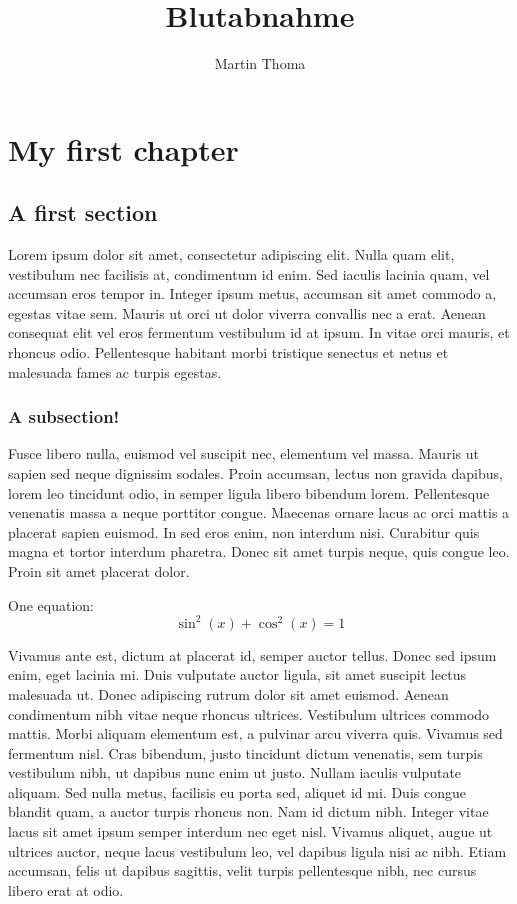 \documentclass[11pt,a4paper,oneside]{report}
\begin{document}
 \title{Blutabnahme}
 \author{Martin Thoma}

\maketitle
\tableofcontents

\chapter{My first chapter}
\section{A first section}
Lorem ipsum dolor sit amet, consectetur adipiscing elit. Nulla quam elit, vestibulum nec facilisis at, condimentum id enim. Sed iaculis lacinia quam, vel accumsan eros tempor in. Integer ipsum metus, accumsan sit amet commodo a, egestas vitae sem. Mauris ut orci ut dolor viverra convallis nec a erat. Aenean consequat elit vel eros fermentum vestibulum id at ipsum. In vitae orci mauris, et rhoncus odio. Pellentesque habitant morbi tristique senectus et netus et malesuada fames ac turpis egestas.

\subsection{A subsection!}
Fusce libero nulla, euismod vel suscipit nec, elementum vel massa. Mauris ut sapien sed neque dignissim sodales. Proin accumsan, lectus non gravida dapibus, lorem leo tincidunt odio, in semper ligula libero bibendum lorem. Pellentesque venenatis massa a neque porttitor congue. Maecenas ornare lacus ac orci mattis a placerat sapien euismod. In sed eros enim, non interdum nisi. Curabitur quis magna et tortor interdum pharetra. Donec sit amet turpis neque, quis congue leo. Proin sit amet placerat dolor.

One equation:
\begin{equation}
    \sin^2(x) + \cos^2(x) = 1
\end{equation}

Vivamus ante est, dictum at placerat id, semper auctor tellus. Donec sed ipsum enim, eget lacinia mi. Duis vulputate auctor ligula, sit amet suscipit lectus malesuada ut. Donec adipiscing rutrum dolor sit amet euismod. Aenean condimentum nibh vitae neque rhoncus ultrices. Vestibulum ultrices commodo mattis. Morbi aliquam elementum est, a pulvinar arcu viverra quis. Vivamus sed fermentum nisl. Cras bibendum, justo tincidunt dictum venenatis, sem turpis vestibulum nibh, ut dapibus nunc enim ut justo. Nullam iaculis vulputate aliquam. Sed nulla metus, facilisis eu porta sed, aliquet id mi. Duis congue blandit quam, a auctor turpis rhoncus non. Nam id dictum nibh. Integer vitae lacus sit amet ipsum semper interdum nec eget nisl. Vivamus aliquet, augue ut ultrices auctor, neque lacus vestibulum leo, vel dapibus ligula nisi ac nibh. Etiam accumsan, felis ut dapibus sagittis, velit turpis pellentesque nibh, nec cursus libero erat at odio.
\end{document}
